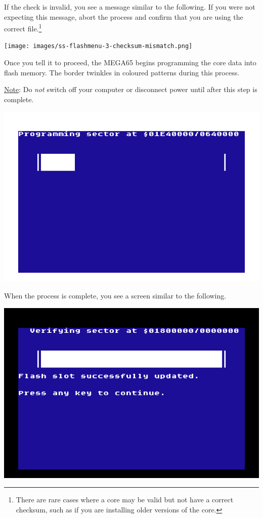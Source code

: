 If the check is invalid, you see a message similar to the following. If you were not expecting this message, abort the process and confirm that you are using the correct file.\footnote{There are rare cases where a core may be valid but not have a correct checksum, such as if you are installing older versions of the core.}

\begin{center}
  \texttt{[image: images/ss-flashmenu-3-checksum-mismatch.png]}
\end{center}

Once you tell it to proceed, the MEGA65 begins programming the core data into flash memory. The border twinkles in coloured patterns during this process.

\underline{Note}: Do {\em not} switch off your computer or disconnect power until after this step is complete.

\begin{center}
  \includegraphics[width=0.7\linewidth]{images/ss-flashmenu-4-programming.png}
\end{center}

When the process is complete, you see a screen similar to the following.

\begin{center}
  \includegraphics[width=0.7\linewidth]{images/ss-flashmenu-done.png}
\end{center}

